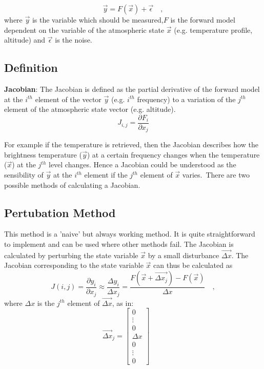 \begin{equation*}
\vec{y}=F(\vec{x})+\vec{\epsilon} \quad ,
\end{equation*}
where $\vec{y}$ is the variable which should be measured,$F$ is the forward
model dependent on the variable of the atmospheric state $\vec{x}$ (e.g.
temperature profile, altitude)  and $\vec{\epsilon}$ is the noise.\\

\subsection*{Definition}
\textbf{Jacobian}:
The Jacobian is defined as the partial derivative of the forward model at the
$i^{th}$ element of the vector $\vec{y}$ (e.g. $i^{th}$ frequency) to a
variation of the $j^{th}$ element of the atmospheric state vector (e.g.
altitude).
\begin{equation*}
J_{i,j}=\frac{\partial F_i}{\partial x_j}
\end{equation*}

For example if the temperature is retrieved, then the Jacobian describes how
the brightness temperature ($\vec{y}$) at a certain frequency changes when the
temperature ($\vec{x}$) at the $j^{th}$ level changes.
Hence a Jacobian could be understood as the sensibility of $\vec{y}$ at the
$i^{th}$ element if the $j^{th}$ element of $\vec{x}$ varies.\
There are two possible methods of calculating a Jacobian.

\subsection*{Pertubation Method}
This method is a 'naive' but always working method. It is quite
straightforward to implement and can be used where other methods
fail. The Jacobian is calculated by perturbing the state variable
$\vec{x}$ by a small disturbance $\vec{\Delta x}$. The Jacobian
corresponding to the state variable $\vec{x}$ can thus be calculated
as
\begin{equation}
J(i,j)=\frac{\partial y_i}{\partial x_j} \approx \frac{\Delta y_i}{\Delta x_j} =
\frac{F(\vec{x}+\vec{\Delta x_j})-F(\vec{x})}{\Delta x} \quad ,
\end{equation}
where $\Delta x$ is the $j^{th}$ element of $\vec{\Delta x} $, as in:
{\setstretch{0.7}
	\begin{equation*}
	\vec{\Delta x}_j=\left[\begin{array}{c} 0 \\ \vdots \\0\\ \Delta x \\ 0\\ \vdots
	\\0\end{array}\right] \qquad
	\end{equation*}
}

